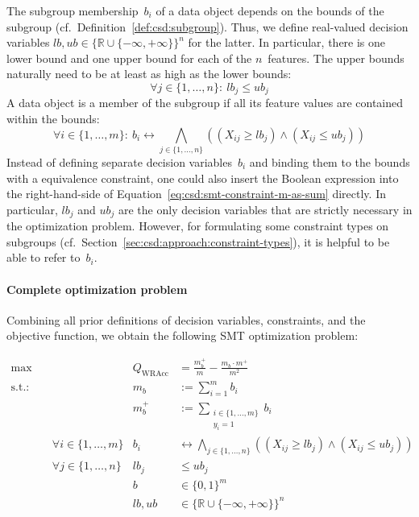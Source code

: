 \documentclass{article}
\theoremstyle{definition}
\begin{document}
The subgroup membership~$b_i$ of a data object depends on the bounds of the subgroup (cf.~Definition~\ref{def:csd:subgroup}).
Thus, we define real-valued decision variables $\mathit{lb}, \mathit{ub} \in \{\mathbb{R} \cup \{-\infty, +\infty\}\}^n$ for the latter.
In particular, there is one lower bound and one upper bound for each of the $n$~features.
The upper bounds naturally need to be at least as high as the lower bounds:
%
\begin{equation}
	\forall j \in \{1, \dots, n\}:~ \mathit{lb}_j\leq \mathit{ub}_j
	\label{eq:csd:smt-constraint-bounds-monotonic}
\end{equation}
%
A data object is a member of the subgroup if all its feature values are contained within the bounds:
%
\begin{equation}
	\forall i \in \{1, \dots, m\}:~ b_i\leftrightarrow \bigwedge_{j \in \{1, \dots, n\}} \left( \left( X_{ij} \geq \mathit{lb}_j \right) \land \left( X_{ij} \leq \mathit{ub}_j \right) \right)
	\label{eq:csd:smt-constraint-subgroup-membership}
\end{equation}
%
Instead of defining separate decision variables~$b_i$ and binding them to the bounds with a equivalence constraint, one could also insert the Boolean expression into the right-hand-side of Equation~\ref{eq:csd:smt-constraint-m-as-sum} directly.
In particular, $\mathit{lb}_j$ and $\mathit{ub}_j$ are the only decision variables that are strictly necessary in the optimization problem.
However, for formulating some constraint types on subgroups (cf.~Section~\ref{sec:csd:approach:constraint-types}), it is helpful to be able to refer to~$b_i$.

\paragraph{Complete optimization problem}

Combining all prior definitions of decision variables, constraints, and the objective function, we obtain the following SMT optimization problem:

\begin{equation}
	\begin{aligned}
		\max &\quad & Q_{\text{WRAcc}} &= \frac{m_b^+}{m} - \frac{m_b \cdot m^+}{m^2} \\
		\text{s.t.:} &\quad & m_b &:= \sum_{i=1}^{m} b_i \\
		&\quad & m_b^+ &:= \sum_{\substack{i \in \{1, \dots, m\} \\ y_i = 1 }} b_i \\
		&\quad \forall i \in \{1, \dots, m\} & b_i &\leftrightarrow \bigwedge_{j \in \{1, \dots, n\}} \left( \left( X_{ij} \geq \mathit{lb}_j \right) \land \left( X_{ij} \leq \mathit{ub}_j \right) \right) \\
		&\quad \forall j \in \{1, \dots, n\} & \mathit{lb}_j &\leq \mathit{ub}_j \\
		&\quad & b &\in \{0, 1\}^m \\
		&\quad & \mathit{lb}, \mathit{ub} &\in \{\mathbb{R} \cup \{-\infty, +\infty\}\}^n
	\end{aligned}
	\label{eq:csd:smt-problem-unconstrained-complete}
\end{equation}
\end{document}
